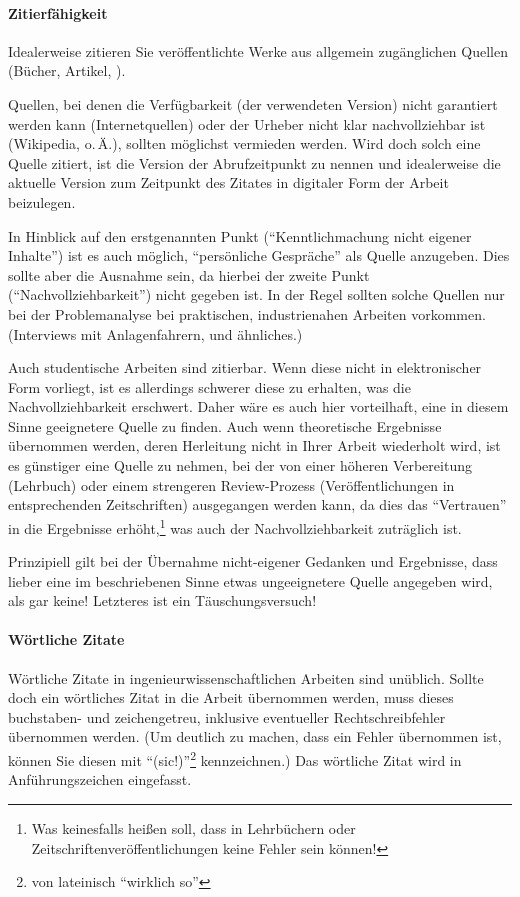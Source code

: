 \paragraph{Zitierfähigkeit}
Idealerweise zitieren Sie veröffentlichte Werke aus allgemein zugänglichen Quellen (Bücher, Artikel, \etc).

Quellen, bei denen die Verfügbarkeit (der verwendeten Version) nicht garantiert werden kann (Internetquellen) oder der Urheber nicht klar nachvollziehbar ist (Wikipedia, o.\,Ä.), sollten möglichst vermieden werden.
Wird doch solch eine Quelle zitiert, ist die Version \bzw der Abrufzeitpunkt zu nennen und idealerweise die aktuelle Version zum Zeitpunkt des Zitates in digitaler Form der Arbeit beizulegen.

In Hinblick auf den erstgenannten Punkt ("`Kenntlichmachung nicht eigener Inhalte"') ist es auch möglich, "`persönliche Gespräche"' als Quelle anzugeben.
Dies sollte aber die Ausnahme sein, da hierbei der zweite Punkt ("`Nachvollziehbarkeit"') nicht gegeben ist.
In der Regel sollten solche Quellen nur bei der Problemanalyse bei praktischen, industrienahen Arbeiten vorkommen. (Interviews mit Anlagenfahrern, und ähnliches.)

Auch studentische Arbeiten sind zitierbar.
Wenn diese nicht in elektronischer Form vorliegt, ist es allerdings schwerer diese zu erhalten, was die Nachvollziehbarkeit erschwert.
Daher wäre es auch hier vorteilhaft, eine in diesem Sinne geeignetere Quelle zu finden.
Auch wenn theoretische Ergebnisse übernommen werden, deren Herleitung nicht in Ihrer Arbeit wiederholt wird, ist es günstiger eine Quelle zu nehmen, bei der von einer höheren Verbereitung (Lehrbuch) oder einem strengeren Review-Prozess (Veröffentlichungen in entsprechenden Zeitschriften) ausgegangen werden kann, da dies das "`Vertrauen"' in die Ergebnisse erhöht,\footnote{Was keinesfalls heißen soll, dass in Lehrbüchern oder Zeitschriftenveröffentlichungen keine Fehler sein können!} was auch der Nachvollziehbarkeit zuträglich ist.

Prinzipiell gilt bei der Übernahme nicht-eigener Gedanken und Ergebnisse, dass lieber eine im beschriebenen Sinne etwas ungeeignetere Quelle angegeben wird, als gar keine!
Letzteres ist ein Täuschungsversuch!


\paragraph{Wörtliche Zitate}
Wörtliche Zitate in ingenieurwissenschaftlichen Arbeiten sind unüblich.
Sollte doch ein wörtliches Zitat in die Arbeit übernommen werden, muss dieses buchstaben- und zeichengetreu, inklusive eventueller Rechtschreibfehler übernommen werden.
(Um deutlich zu machen, dass ein Fehler übernommen ist, können Sie diesen mit "`(sic!)"'\footnote{von lateinisch "`wirklich so"'} kennzeichnen.)
Das wörtliche Zitat wird in Anführungszeichen eingefasst.


